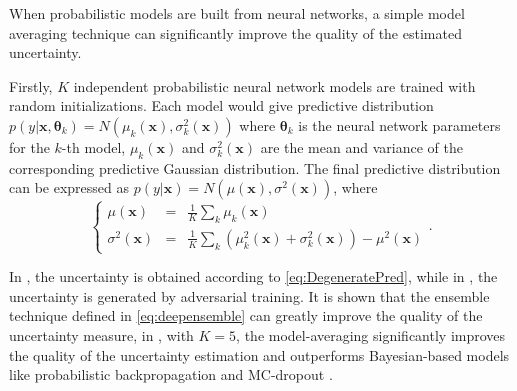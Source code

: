 When probabilistic models are built from neural networks, a simple model averaging technique\cite{lazaro2010marginalized, huang2015scalable, lakshminarayanan2017simple} can significantly improve the quality of the estimated uncertainty.

Firstly, $K$ independent probabilistic neural network models are trained with random initializations. Each model would give predictive distribution $p(y | \bm{x}, \bm{\theta}_k) = N(\mu_k(\bm{x}), \sigma_k^2(\bm{x}))$ where $\bm{\theta}_k$ is the neural network parameters for the $k$-th model, $\mu_k(\bm{x})$ and $\sigma_k^2(\bm{x})$ are the mean and variance of the corresponding predictive Gaussian distribution. The final predictive distribution can be expressed as $p(y | \bm{x}) = N(\mu(\bm{x}), \sigma^2(\bm{x}))$, where
\begin{equation}
    \left\{
        \begin{array}{lll}
            \mu(\bm{x})      &=& \frac{1}{K} \sum_k \mu_k(\bm{x}) \\
            \sigma^2(\bm{x}) &=& \frac{1}{K} \sum_k (\mu_k^2(\bm{x}) + \sigma_k^2(\bm{x})) - \mu^2(\bm{x})
        \end{array}.
    \right.
    \label{eq:deepensemble}
\end{equation}

In \cite{lazaro2010marginalized, huang2015scalable}, the uncertainty is obtained according to \eqref{eq:DegeneratePred}, while in \cite{lakshminarayanan2017simple}, the uncertainty is generated by adversarial training. It is shown that the ensemble technique defined in \eqref{eq:deepensemble} can greatly improve the quality of the uncertainty measure, in \cite{lakshminarayanan2017simple}, with $K = 5$, the model-averaging significantly improves the quality of the uncertainty estimation and outperforms Bayesian-based models like probabilistic backpropagation \cite{hernandez2015probabilistic} and MC-dropout \cite{gal2016dropout}.
